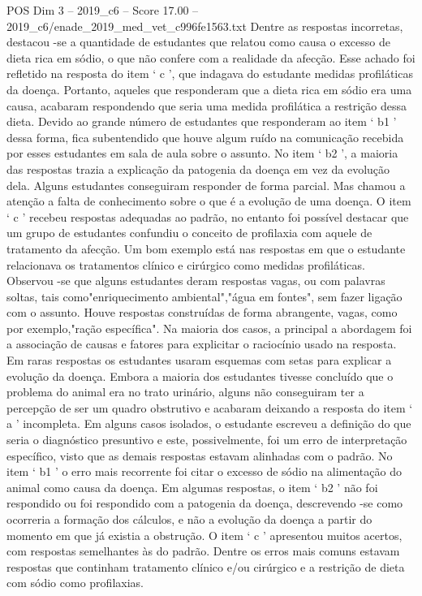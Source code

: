 \begin{textsample}{POS Dim 3 – 2019\_c6 – Score 17.00 – 2019\_c6/enade\_2019\_med\_vet\_c996fe1563.txt}
Dentre as respostas incorretas, destacou -se a quantidade de estudantes que relatou como causa o excesso de dieta rica em sódio, o que não confere com a realidade da afecção.
Esse achado foi refletido na resposta do item ‘ c ’, que indagava do estudante medidas profiláticas da doença.
Portanto, aqueles que responderam que a dieta rica em sódio era uma causa, acabaram respondendo que seria uma medida profilática a restrição dessa dieta.
Devido ao grande número de estudantes que responderam ao item ‘ b1 ’ dessa forma, fica subentendido que houve algum ruído na comunicação recebida por esses estudantes em sala de aula sobre o assunto.
No item ‘ b2 ’, a maioria das respostas trazia a explicação da patogenia da doença em vez da evolução dela.
Alguns estudantes conseguiram responder de forma parcial.
Mas chamou a atenção a falta de conhecimento sobre o que é a evolução de uma doença.
O item ‘ c ’ recebeu respostas adequadas ao padrão, no entanto foi possível destacar que um grupo de estudantes confundiu o conceito de profilaxia com aquele de tratamento da afecção.
Um bom exemplo está nas respostas em que o estudante relacionava os tratamentos clínico e cirúrgico como medidas profiláticas.
Observou -se que alguns estudantes deram respostas vagas, ou com palavras soltas, tais como"enriquecimento ambiental","água em fontes", sem fazer ligação com o assunto.
Houve respostas construídas de forma abrangente, vagas, como por exemplo,"ração específica".
Na maioria dos casos, a principal a abordagem foi a associação de causas e fatores para explicitar o raciocínio usado na resposta.
Em raras respostas os estudantes usaram esquemas com setas para explicar a evolução da doença.
Embora a maioria dos estudantes tivesse concluído que o problema do animal era no trato urinário, alguns não conseguiram ter a percepção de ser um quadro obstrutivo e acabaram deixando a resposta do item ‘ a ’ incompleta.
Em alguns casos isolados, o estudante escreveu a definição do que seria o diagnóstico presuntivo e este, possivelmente, foi um erro de interpretação específico, visto que as demais respostas estavam alinhadas com o padrão.
No item ‘ b1 ’ o erro mais recorrente foi citar o excesso de sódio na alimentação do animal como causa da doença.
Em algumas respostas, o item ‘ b2 ’ não foi respondido ou foi respondido com a patogenia da doença, descrevendo -se como ocorreria a formação dos cálculos, e não a evolução da doença a partir do momento em que já existia a obstrução.
O item ‘ c ’ apresentou muitos acertos, com respostas semelhantes às do padrão.
Dentre os erros mais comuns estavam respostas que continham tratamento clínico e/ou cirúrgico e a restrição de dieta com sódio como profilaxias.

\end{textsample}
